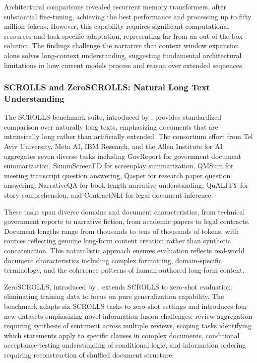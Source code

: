 Architectural comparisons revealed recurrent memory transformers, after substantial fine-tuning, achieving the best performance and processing up to fifty million tokens. However, this capability requires significant computational resources and task-specific adaptation, representing far from an out-of-the-box solution. The findings challenge the narrative that context window expansion alone solves long-context understanding, suggesting fundamental architectural limitations in how current models process and reason over extended sequences.

\subsubsection{SCROLLS and ZeroSCROLLS: Natural Long Text Understanding}

The SCROLLS benchmark suite, introduced by \citet{shaham2022scrolls}, provides standardized comparison over naturally long texts, emphasizing documents that are intrinsically long rather than artificially extended. The consortium effort from Tel Aviv University, Meta AI, IBM Research, and the Allen Institute for AI aggregates seven diverse tasks including GovReport for government document summarization, SummScreenFD for screenplay summarization, QMSum for meeting transcript question answering, Qasper for research paper question answering, NarrativeQA for book-length narrative understanding, QuALITY for story comprehension, and ContractNLI for legal document inference.

These tasks span diverse domains and document characteristics, from technical government reports to narrative fiction, from academic papers to legal contracts. Document lengths range from thousands to tens of thousands of tokens, with sources reflecting genuine long-form content creation rather than synthetic concatenation. This naturalistic approach ensures evaluation reflects real-world document characteristics including complex formatting, domain-specific terminology, and the coherence patterns of human-authored long-form content.

ZeroSCROLLS, introduced by \citet{shaham2023zeroscrolls}, extends SCROLLS to zero-shot evaluation, eliminating training data to focus on pure generalization capability. The benchmark adapts six SCROLLS tasks to zero-shot settings and introduces four new datasets emphasizing novel information fusion challenges: review aggregation requiring synthesis of sentiment across multiple reviews, scoping tasks identifying which statements apply to specific clauses in complex documents, conditional acceptance testing understanding of conditional logic, and information ordering requiring reconstruction of shuffled document structure.


